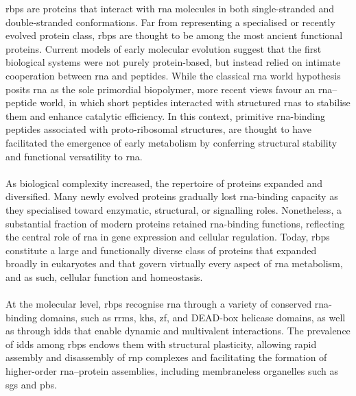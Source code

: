 \glspl{rbp} are proteins that interact with \gls{rna} molecules in both single-stranded and double-stranded conformations\cite{corley_how_2020}. Far from representing a specialised or recently evolved protein class, \glspl{rbp} are thought to be among the most ancient functional proteins\cite{kerner_evolution_2011, farias_rnp-world_2022, gerstberger_census_2014}. Current models of early molecular evolution suggest that the first biological systems were not purely protein-based, but instead relied on intimate cooperation between \gls{rna} and peptides\cite{farias_rnp-world_2022}. While the classical \gls{rna} world hypothesis posits \gls{rna} as the sole primordial biopolymer, more recent views favour an \gls{rna}–peptide world, in which short peptides interacted with structured \glspl{rna} to stabilise them and enhance catalytic efficiency\cite{farias_rnp-world_2022}. In this context, primitive \gls{rna}-binding peptides associated with proto-ribosomal structures, are thought to have facilitated the emergence of early metabolism by conferring structural stability and functional versatility to \gls{rna}\cite{farias_rnp-world_2022, hentze_brave_2018}.
\\
\\
As biological complexity increased, the repertoire of proteins expanded and diversified\cite{farias_rnp-world_2022}. Many newly evolved proteins gradually lost \gls{rna}-binding capacity as they specialised toward enzymatic, structural, or signalling roles\cite{farias_rnp-world_2022, gerstberger_census_2014}. Nonetheless, a substantial fraction of modern proteins retained \gls{rna}-binding functions, reflecting the central role of \gls{rna} in gene expression and cellular regulation\cite{farias_rnp-world_2022, hentze_brave_2018, gerstberger_census_2014}. Today, \glspl{rbp} constitute a large and functionally diverse class of proteins that expanded broadly in eukaryotes\cite{corley_how_2020, holmqvist_rna-binding_2018} and that govern virtually every aspect of \gls{rna} metabolism, and as such, cellular function and homeostasis\cite{corley_how_2020, holmqvist_rna-binding_2018, gerstberger_census_2014, hentze_brave_2018, kelaini_rna-binding_2021, van_nostrand_large-scale_2020}.
\\
\\
At the molecular level, \glspl{rbp} recognise \gls{rna} through a variety of conserved \gls{rna}-binding domains, such as \glspl{rrm}, \glspl{kh}, \gls{zf}, and DEAD-box helicase domains, as well as through \glspl{idd} that enable dynamic and multivalent interactions\cite{corley_how_2020, gerstberger_census_2014}. The prevalence of \glspl{idd} among \glspl{rbp} endows them with structural plasticity, allowing rapid assembly and disassembly of \gls{rnp} complexes and facilitating the formation of higher-order \gls{rna}–protein assemblies, including membraneless organelles such as \glspl{sg} and \glspl{pb}\cite{hentze_brave_2018, redding_stress_2023, wear_proteins_2015, marcelo_stress_2021}.
